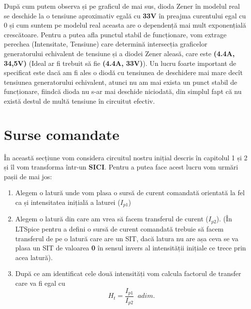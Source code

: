 \documentclass[12pt, a4paper]{article}
\begin{document}
\vspace{3cm}
După cum putem observa și pe graficul de mai sus, dioda Zener în modelul real se deschide la o tensiune aproximativ egală cu \textbf{33V} în preajma curentului egal cu 0 și cum suntem pe modelul real aceasta are o dependență mai mult exponențială crescătoare. Pentru a putea afla punctul stabil de funcționare, vom extrage perechea (Intensitate, Tensiune) care determină intersecția graficelor generatorului echivalent de tensiune și a diodei Zener aleasă, care este \textbf{(4.4A, 34,5V)} (Ideal ar fi trebuit să fie \textbf{(4.4A, 33V)}). Un lucru foarte important de specificat este dacă am fi ales o diodă cu tensiunea de deschidere mai mare decît tensiunea generatorului echivalent, atunci nu am mai exista un punct stabil de funcționare, fiindcă dioda nu s-ar mai deschide niciodată, din simplul fapt că nu există destul de multă tensiune în circuitut efectiv.
\newpage

\section{Surse comandate}
În această secțiune vom considera circuitul nostru inițial descris în capitolul 1 și 2 și îl vom transforma într-un \textbf{SICI}. Pentru a putea face acest lucru vom urmări pașii de mai jos:

\begin{enumerate}
    \item Alegem o latură unde vom plasa o sursă de curent comandată orientată la fel ca și intensitatea inițială a laturei ($I_{p1}$)
    \item Alegem o latură din care am vrea să facem transferul de curent ($I_{p2}$). (În LTSpice pentru a defini o sursă de curent comandată trebuie să facem transferul de pe o latură care are un SIT, dacă latura nu are așa ceva se va plasa un SIT de valoarea \textbf{0} în sensul invers al intensității inițiale ce trece prin acea latură).
    \item După ce am identificat cele două intensități vom calcula factorul de transfer care va fi egal cu $$H_t = \frac{I_{p1}}{I_{p2}} \;\;adim.$$
\end{enumerate}
\end{document}
